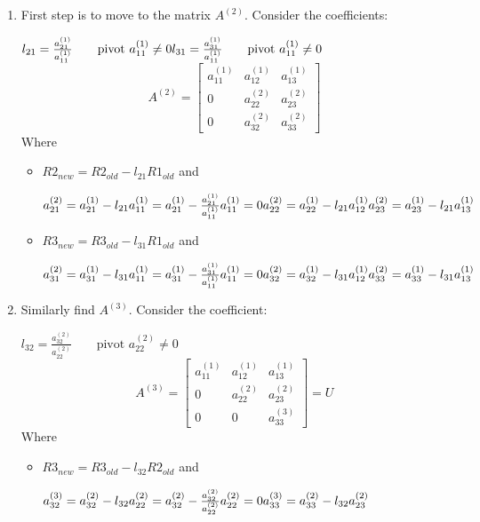 \begin{enumerate}
    \item First step is to move to the matrix $A^{(2)}$. Consider the coefficients:
    
    $
    l_{21}=\frac{a_{21}^{(1)}}{a_{11}^{(1)}}\qquad\text{pivot $a_{11}^{(1)}\neq 0$}\\
    \\
    l_{31}=\frac{a_{31}^{(1)}}{a_{11}^{(1)}}\qquad\text{pivot $a_{11}^{(1)}\neq 0$}
    $
    $$
    A^{(2)}=\begin{bmatrix}
        a_{11}^{(1)} & a_{12}^{(1)} & a_{13}^{(1)}\\
        0 & a_{22}^{(2)} & a_{23}^{(2)}\\
        0 & a_{32}^{(2)} & a_{33}^{(2)}
    \end{bmatrix}        
    $$
    Where
    \begin{itemize}
        \item $R2_{new}=R2_{old}-l_{21}R1_{old}$ and
        
        $
        a_{21}^{(2)}=a_{21}^{(1)}-l_{21}a_{11}^{(1)}=a_{21}^{(1)}-\frac{a_{21}^{(1)}}{a_{11}^{(1)}}a_{11}^{(1)}=0\\
        \\
        a_{22}^{(2)}=a_{22}^{(1)}-l_{21}a_{12}^{(1)}\\
        \\
        a_{23}^{(2)}=a_{23}^{(1)}-l_{21}a_{13}^{(1)}
        $
        \item $R3_{new}=R3_{old}-l_{31}R1_{old}$ and
        
        $
        a_{31}^{(2)}=a_{31}^{(1)}-l_{31}a_{11}^{(1)}=a_{31}^{(1)}-\frac{a_{31}^{(1)}}{a_{11}^{(1)}}a_{11}^{(1)}=0\\
        \\
        a_{32}^{(2)}=a_{32}^{(1)}-l_{31}a_{12}^{(1)}\\
        \\
        a_{33}^{(2)}=a_{33}^{(1)}-l_{31}a_{13}^{(1)}\\
        $
    \end{itemize}
    \item Similarly find $A^{(3)}$. Consider the coefficient:
    
    $
    l_{32}=\frac{a_{32}^{(2)}}{a_{22}^{(2)}}\qquad\text{pivot $a_{22}^{(2)}\neq 0$}
    $
    $$
    A^{(3)}=\begin{bmatrix}
        a_{11}^{(1)} & a_{12}^{(1)} & a_{13}^{(1)}\\
        0 & a_{22}^{(2)} & a_{23}^{(2)}\\
        0 & 0 & a_{33}^{(3)}
    \end{bmatrix}=U
    $$
    Where
    \begin{itemize}
        \item $R3_{new}=R3_{old}-l_{32}R2_{old}$ and
        
        $
        a_{32}^{(3)}=a_{32}^{(2)}-l_{32}a_{22}^{(2)}=a_{32}^{(2)}-\frac{a_{32}^{(2)}}{a_{22}^{(2)}}a_{22}^{(2)}=0\\
        \\
        a_{33}^{(3)}=a_{33}^{(2)}-l_{32}a_{23}^{(2)}
        $
    \end{itemize}
\end{enumerate}
